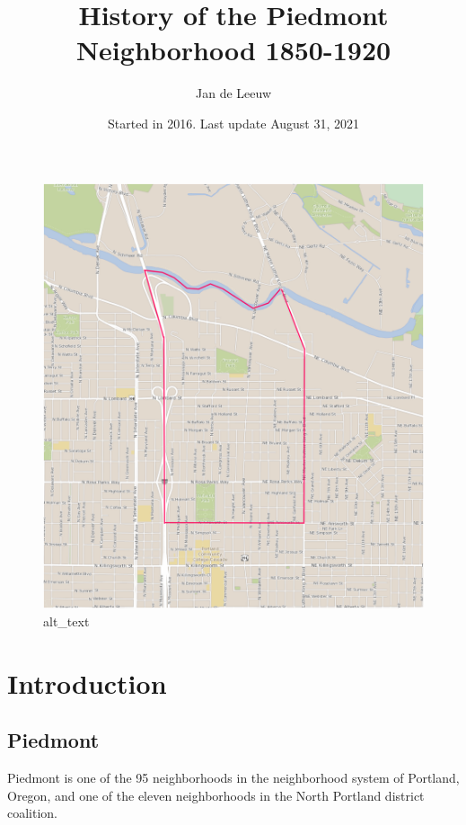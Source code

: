 \documentclass[
  12pt,
]{book}
\title{History of the Piedmont Neighborhood 1850-1920}
\author{Jan de Leeuw}
\date{Started in 2016. Last update August 31, 2021}
\begin{document}
\maketitle

{
\setcounter{tocdepth}{4}
\tableofcontents
}
\begin{figure}
\centering
\includegraphics{images/00_images/image1.png}
\caption{alt\_text}
\end{figure}

\hypertarget{introduction}{%
\chapter*{Introduction}\label{introduction}}

\hypertarget{piedmont}{%
\section*{Piedmont}\label{piedmont}}

Piedmont is one of the 95 neighborhoods in the neighborhood system of Portland, Oregon, and one of the eleven neighborhoods in the North Portland district coalition.
\end{document}
